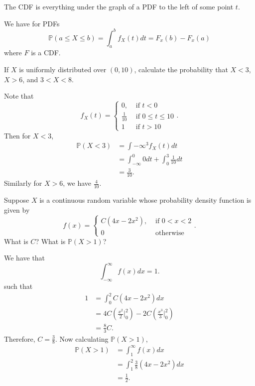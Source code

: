 
\begin{definition}
	The CDF is everything under the graph of a PDF to the left of some point \( t \).
\end{definition}

\begin{theorem}
	We have for PDFs
	\[ \mathbb{P}(a\le X\le b) = \int_{a}^{b}f_X(t) dt = F_x(b) - F_x(a)\]
	where \( F \) is a CDF.
\end{theorem}

\begin{eg}
	If \( X \) is uniformly distributed over \( (0, 10) \), calculate the probability that \( X<3 \), \( X>6 \), and \( 3<X<8 \).
\end{eg}
\begin{explanation}
	Note that \[
		f_X(t) = \begin{cases}
			0, &\text{ if }t<0\\
			\frac{1}{10} &\text{ if } 0\le t\le 10 \\
			1 &\text{ if } t > 10
		\end{cases}
	.\] Then for \( X<3 \),
	\begin{align*}
		\mathbb{P}(X < 3) &= \int{-\infty}^{3} f_X(t) dt \\
		&= \int_{-\infty}^{0}0 dt + \int_{0}^{3}\frac{1}{10}dt  \\
		&= \frac{3}{10}
	.\end{align*}
	Similarly for \( X>6 \), we have \( \frac{4}{10} \).
\end{explanation}

\begin{eg}
	Suppose \( X \) is a continuous random variable whose probability density function is given by \[
		f(x) = \begin{cases}
			C(4x-2x^{2} ), &\text{ if }0<x<2\\
			0 &\text{ otherwise}
		\end{cases}
	.\] 
	What is \( C \)? What is \( \mathbb{P}(X>1) \)?
\end{eg}
\begin{explanation}
	We have that \[
		\int_{-\infty}^{\infty}f(x)dx = 1 
	.\] such that 
	\begin{align*}
		1 &= \int_{0}^{2}C(4x-2x^{2} ) dx\\
		&= 4C\left(\frac{x^{2} }{2} |_0^{2} \right) - 2C \left(\frac{x^{3} }{3} |_0^{2}\right)  \\
		&= \frac{8}{3}C 
	.\end{align*}
	Therefore, \( C = \frac{3}{8} \). Now calculating \( \mathbb{P}(X>1) \), 
	\begin{align*}
		\mathbb{P}(X>1) &= \int_{1}^{\infty} f(x)dx \\
										&= \int_{1}^{2}\frac{3}{8}(4x-2x^{2} )dx  \\
										&= \frac{1}{2} 
	.\end{align*}
\end{explanation}

